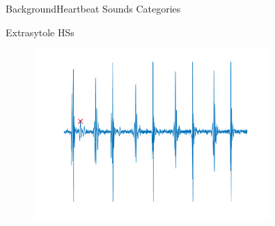 \documentclass[10pt]{beamer}
\begin{document}
\begin{frame}{Background}{Heartbeat Sounds Categories}
{\begin{block}{Extrasytole HSs}
 		\begin{figure}
 			
 			\includegraphics[width=0.8\textwidth,height=0.5\textheight]{AAUgraphics/extrasys.png}
 			
 		\end{figure}
 	\end{block}
 	
 }
 
 
 
\end{frame}
\end{document}
